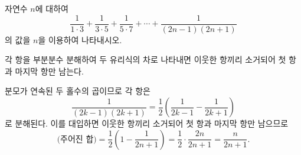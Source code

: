 \documentclass[10pt]{article}
\begin{document}
\begin{dmproblem}
자연수 $n$에 대하여
\begin{equation*}
  \frac{1}{1 \cdot 3} + \frac{1}{3 \cdot 5} + \frac{1}{5 \cdot 7} + \cdots + \frac{1}{(2n - 1)(2n + 1)}
\end{equation*}
의 값을 $n$을 이용하여 나타내시오.
\end{dmproblem}

\begin{dmapproach}
각 항을 부분분수 분해하여 두 유리식의 차로 나타내면 이웃한 항끼리 소거되어 첫 항과 마지막 항만 남는다.
\end{dmapproach}

\begin{dmsolution}
분모가 연속된 두 홀수의 곱이므로 각 항은
\begin{equation*}
  \frac{1}{(2k - 1)(2k + 1)} = \frac{1}{2}\left(\frac{1}{2k - 1} - \frac{1}{2k + 1}\right)
\end{equation*}
로 분해된다. 이를 대입하면 이웃한 항끼리 소거되어 첫 항과 마지막 항만 남으므로
\begin{equation*}
  \text{(주어진 합)} = \frac{1}{2}\left(1 - \frac{1}{2n + 1}\right) = \frac{1}{2}\cdot\frac{2n}{2n + 1} = \frac{n}{2n + 1}.
\end{equation*}
\end{dmsolution}

\dmchecktitle



\newpage

\dmconcepthead
{}
\end{document}
